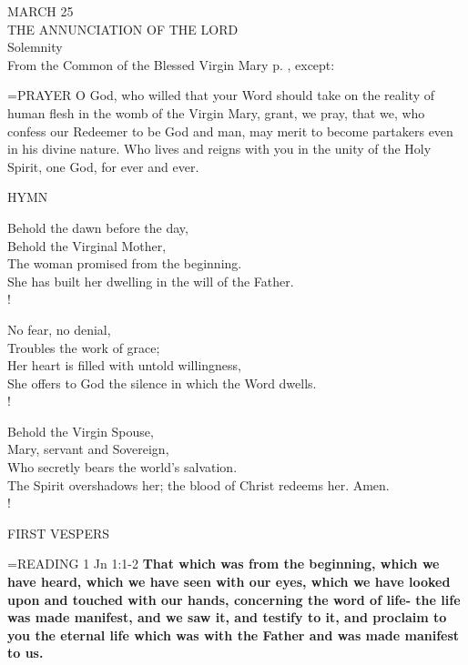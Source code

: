 \begin{center}\normalsize MARCH 25\\
\footnotesize THE ANNUNCIATION OF THE LORD\\
\footnotesize Solemnity\\
\footnotesize From the Common of the Blessed Virgin Mary p.   , except:\\
\end{center}

\hangindent=\parindent \small{PRAYER 
O God, who willed that your Word
should take on the reality of human flesh
in the womb of the Virgin Mary,
grant, we pray,
that we, who confess our Redeemer to be God and man,
may merit to become partakers even in his divine nature.
Who lives and reigns with you in the unity of the Holy Spirit,
one God, for ever and ever.\\}
 

\noindent\small{\uppercase{Hymn}}\normalsize\label{annunciation:hymn}
\begin{cverse}
Behold the dawn before the day,\\
Behold the Virginal Mother,\\
The woman promised from the beginning.\\
She has built her dwelling in the will of the Father.\\!

No fear, no denial,\\
Troubles the work of grace;\\
Her heart is filled with untold willingness,\\
She offers to God the silence in which the Word dwells.\\!

Behold the Virgin Spouse,\\
Mary, servant and Sovereign,\\
Who secretly bears the world’s salvation.\\
The Spirit overshadows her; the blood of Christ redeems her. Amen.\\!
\end{cverse}

\begin{flushleft}\normalsize FIRST VESPERS\\\end{flushleft}

\hangindent=\parindent \small{READING} 1 Jn 1:1-2 \textbf{That which was from the beginning, which we
have heard, which we have seen with our eyes, which we have
looked upon and touched with our hands, concerning the word of
life- the life was made manifest, and we saw it, and testify to it, and
proclaim to you the eternal life which was with the Father and was
made manifest to us.\\}
 
